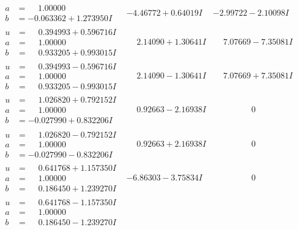 \documentclass[1p]{elsarticle_modified}
\theoremstyle{definition}
\begin{document}
$$\begin{array}{c|c|c}
\begin{aligned}
a &= \phantom{-}1.00000\phantom{ +0.000000I} \\
b &= -0.063362 + 1.273950 I\end{aligned}
 & -4.46772 + 0.64019 I & -2.99722 - 2.10098 I \\ \hline\begin{aligned}
u &= \phantom{-}0.394993 + 0.596716 I \\
a &= \phantom{-}1.00000\phantom{ +0.000000I} \\
b &= \phantom{-}0.933205 + 0.993015 I\end{aligned}
 & \phantom{-}2.14090 + 1.30641 I & \phantom{-}7.07669 - 7.35081 I \\ \hline\begin{aligned}
u &= \phantom{-}0.394993 - 0.596716 I \\
a &= \phantom{-}1.00000\phantom{ +0.000000I} \\
b &= \phantom{-}0.933205 - 0.993015 I\end{aligned}
 & \phantom{-}2.14090 - 1.30641 I & \phantom{-}7.07669 + 7.35081 I \\ \hline\begin{aligned}
u &= \phantom{-}1.026820 + 0.792152 I \\
a &= \phantom{-}1.00000\phantom{ +0.000000I} \\
b &= -0.027990 + 0.832206 I\end{aligned}
 & \phantom{-}0.92663 - 2.16938 I & \phantom{-0.000000 } 0 \\ \hline\begin{aligned}
u &= \phantom{-}1.026820 - 0.792152 I \\
a &= \phantom{-}1.00000\phantom{ +0.000000I} \\
b &= -0.027990 - 0.832206 I\end{aligned}
 & \phantom{-}0.92663 + 2.16938 I & \phantom{-0.000000 } 0 \\ \hline\begin{aligned}
u &= \phantom{-}0.641768 + 1.157350 I \\
a &= \phantom{-}1.00000\phantom{ +0.000000I} \\
b &= \phantom{-}0.186450 + 1.239270 I\end{aligned}
 & -6.86303 - 3.75834 I & \phantom{-0.000000 } 0 \\ \hline\begin{aligned}
u &= \phantom{-}0.641768 - 1.157350 I \\
a &= \phantom{-}1.00000\phantom{ +0.000000I} \\
b &= \phantom{-}0.186450 - 1.239270 I\end{aligned}

\end{array}$$
\end{document}
